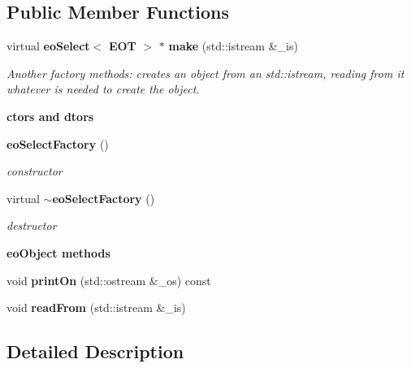 \subsection*{Public Member Functions}
\begin{CompactItemize}
\item 
virtual {\bf eo\-Select}$<$ {\bf EOT} $>$ $\ast$ {\bf make} (std::istream \&\_\-is)
\begin{CompactList}\small\item\em Another factory methods: creates an object from an std::istream, reading from it whatever is needed to create the object. \item\end{CompactList}\end{CompactItemize}
\begin{Indent}{\bf ctors and dtors}\par
\begin{CompactItemize}
\item 
{\bf eo\-Select\-Factory} ()\label{classeo_select_factory_z20_0}

\begin{CompactList}\small\item\em constructor \item\end{CompactList}\item 
virtual {\bf $\sim$eo\-Select\-Factory} ()\label{classeo_select_factory_z20_1}

\begin{CompactList}\small\item\em destructor \item\end{CompactList}\end{CompactItemize}
\end{Indent}
\begin{Indent}{\bf eo\-Object methods}\par
\begin{CompactItemize}
\item 
void {\bf print\-On} (std::ostream \&\_\-os) const \label{classeo_select_factory_z22_0}

\item 
void {\bf read\-From} (std::istream \&\_\-is)\label{classeo_select_factory_z22_1}

\end{CompactItemize}
\end{Indent}


\subsection{Detailed Description}
